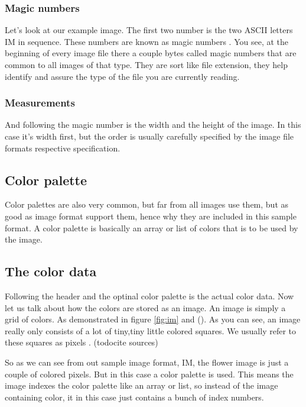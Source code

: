 \begin{refsection}
  \subsubsection{Magic numbers}
  \label{sec:magic-numbers}

  Let's look at our example image. The first two number is the two
  ASCII letters IM in sequence. These numbers are known as magic
  numbers . You see, at the beginning of every
  image file there a couple bytes called magic numbers that are common
  to all images of that type. They are sort like file extension, they
  help identify and assure the type of the file you are currently
  reading.

  \subsubsection{Measurements}
  \label{sec:measurements}

  And following the magic number is the width and the height of the
  image. In this case it's width first, but the order is usually
  carefully specified by the image file formats respective
  specification.

  \subsection{Color palette}
  \label{sec:color-pallete}

  Color palettes  are also very common, but far
  from all images use them, but as good as image format support them,
  hence why they are included in this sample format. A color palette
  is basically an array or list of colors that is to be used by the
  image.

  \subsection{The color data}
  \label{sec:color-data}

  Following the header and the optinal color palette is the actual
  color data. Now let us talk about how the colors are stored as an
  image. An image is simply a grid of colors. As demonstrated in
  figure \ref{fig:im} and (). As you can
  see, an image really only consists of a lot of tiny,tiny little
  colored squares. We usually refer to these squares as pixels
  . (todo{cite sources})

  So as we can see from out sample image format, IM, the flower image
  is just a couple of colored pixels. But in this case a color palette
  is used. This means the image indexes the color palette like an
  array or list, so instead of the image containing color, it in this
  case just contains a bunch of index numbers.


\end{refsection}
